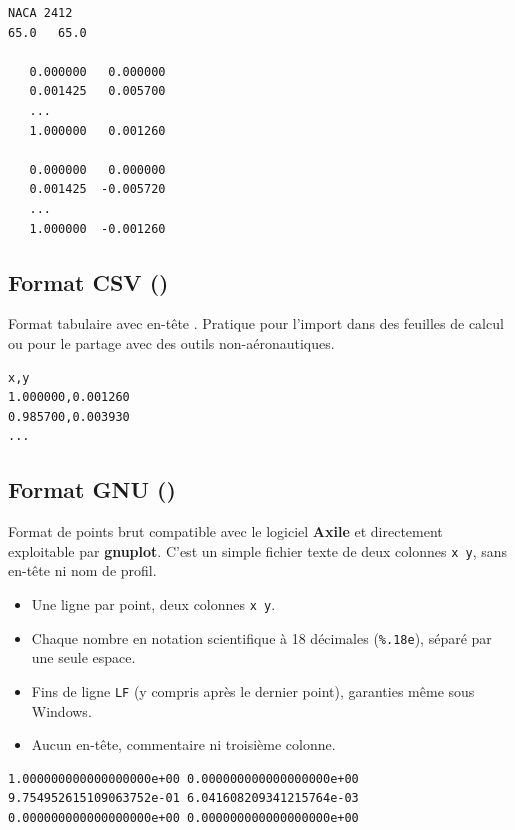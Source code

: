 \begin{lstlisting}[caption={Exemple de fichier Lednicer}]
NACA 2412
65.0   65.0

   0.000000   0.000000
   0.001425   0.005700
   ...
   1.000000   0.001260

   0.000000   0.000000
   0.001425  -0.005720
   ...
   1.000000  -0.001260
\end{lstlisting}

\subsection{Format CSV ()}

Format tabulaire avec en-tête . Pratique pour
l'import dans des feuilles de calcul ou pour le partage avec des
outils non-aéronautiques.

\begin{lstlisting}[caption={Exemple de fichier CSV}]
x,y
1.000000,0.001260
0.985700,0.003930
...
\end{lstlisting}

\subsection{Format GNU ()}

Format de points brut compatible avec le logiciel \textbf{Axile} et
directement exploitable par \textbf{gnuplot}. C'est un simple fichier
texte de deux colonnes \texttt{x~y}, sans en-tête ni nom de profil.

\begin{itemize}
    \item Une ligne par point, deux colonnes \texttt{x y}.
    \item Chaque nombre en notation scientifique à 18 décimales
        (\texttt{\%.18e}), séparé par une seule espace.
    \item Fins de ligne \texttt{LF} (y compris après le dernier point),
        garanties même sous Windows.
    \item Aucun en-tête, commentaire ni troisième colonne.
\end{itemize}

\begin{lstlisting}[caption={Exemple de fichier GNU (.gnu)}]
1.000000000000000000e+00 0.000000000000000000e+00
9.754952615109063752e-01 6.041608209341215764e-03
0.000000000000000000e+00 0.000000000000000000e+00
\end{lstlisting}

